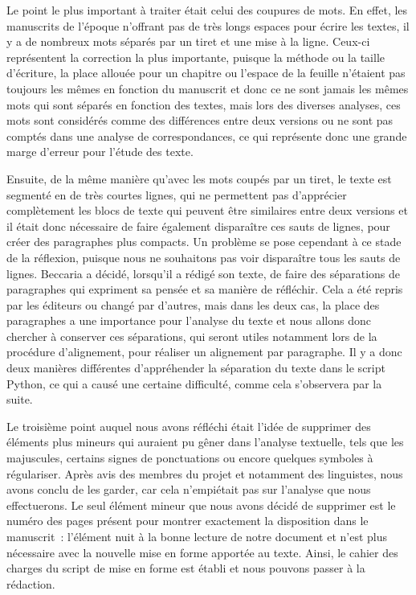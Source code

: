 Le point le plus important à traiter était celui des coupures de mots. En effet, les manuscrits de l'époque n'offrant pas de très longs espaces pour écrire les textes, il y a de nombreux mots séparés par un tiret et une mise à la ligne. Ceux-ci représentent la correction la plus importante, puisque la méthode ou la taille d'écriture, la place allouée pour un chapitre ou l'espace de la feuille n'étaient pas toujours les mêmes en fonction du manuscrit et donc ce ne sont jamais les mêmes mots qui sont séparés en fonction des textes, mais lors des diverses analyses, ces mots sont considérés comme des différences entre deux versions ou ne sont pas comptés dans une analyse de correspondances, ce qui représente donc une grande marge d'erreur pour l'étude des texte.

Ensuite, de la même manière qu'avec les mots coupés par un tiret, le texte est segmenté en de très courtes lignes, qui ne permettent pas d'apprécier complètement les blocs de texte qui peuvent être similaires entre deux versions et il était donc nécessaire de faire également disparaître ces sauts de lignes, pour créer des paragraphes plus compacts. Un problème se pose cependant à ce stade de la réflexion, puisque nous ne souhaitons pas voir disparaître tous les sauts de lignes. Beccaria a décidé, lorsqu'il a rédigé son texte, de faire des séparations de paragraphes qui expriment sa pensée et sa manière de réfléchir. Cela a été repris par les éditeurs ou changé par d'autres, mais dans les deux cas, la place des paragraphes a une importance pour l'analyse du texte et nous allons donc chercher à conserver ces séparations, qui seront utiles notamment lors de la procédure d'alignement, pour réaliser un alignement par paragraphe. Il y a donc deux manières différentes d'appréhender la séparation du texte dans le script Python, ce qui a causé une certaine difficulté, comme cela s'observera par la suite.

Le troisième point auquel nous avons réfléchi était l'idée de supprimer des éléments plus mineurs qui auraient pu gêner dans l'analyse textuelle, tels que les majuscules, certains signes de ponctuations ou encore quelques symboles à régulariser. Après avis des membres du projet et notamment des linguistes, nous avons conclu de les garder, car cela n'empiétait pas sur l'analyse que nous effectuerons. Le seul élément mineur que nous avons décidé de supprimer est le numéro des pages présent pour montrer exactement la disposition dans le manuscrit~: l'élément nuit à la bonne lecture de notre document et n'est plus nécessaire avec la nouvelle mise en forme apportée au texte. Ainsi, le cahier des charges du script de mise en forme est établi et nous pouvons passer à la rédaction.

